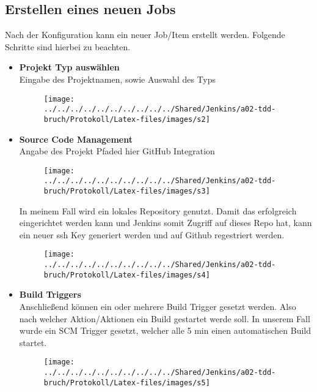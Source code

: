 \subsection{Erstellen eines neuen Jobs}
Nach der Konfiguration kann ein neuer Job/Item erstellt werden.
Folgende Schritte sind hierbei zu beachten.
\begin{itemize}
	\item \textbf{Projekt Typ auswählen}\\
	Eingabe des Projektnamen, sowie Auswahl des Typs
	\begin{figure}[!h]
		\centering
		\texttt{[image: ../../../../../../../../../../Shared/Jenkins/a02-tdd-bruch/Protokoll/Latex-files/images/s2]}
		\label{fig:s2}
	\end{figure}
	
	\item \textbf{Source Code Management}\\
	Angabe des Projekt Pfaded hier GitHub Integration
	\begin{figure}[!h]
		\centering
		\texttt{[image: ../../../../../../../../../../Shared/Jenkins/a02-tdd-bruch/Protokoll/Latex-files/images/s3]}
		\label{fig:s3}
	\end{figure}
	In meinem Fall wird ein lokales Repository genutzt. Damit das erfolgreich eingerichtet werden kann und Jenkins somit Zugriff auf dieses Repo hat, kann ein neuer ssh Key generiert werden und auf Github regestriert werden.
	\begin{figure}[!h]
		\centering
		\texttt{[image: ../../../../../../../../../../Shared/Jenkins/a02-tdd-bruch/Protokoll/Latex-files/images/s4]}
		\label{fig:s4}
	\end{figure}
	
	\clearpage
	
	\item \textbf{Build Triggers}\\
	Anschließend können ein oder mehrere Build Trigger gesetzt werden. Also nach welcher Aktion/Aktionen ein Build gestartet werde soll. In unserem Fall wurde ein SCM Trigger gesetzt, welcher alle 5 min einen automatischen Build startet.
	\begin{figure}[!h]
		\centering
		\texttt{[image: ../../../../../../../../../../Shared/Jenkins/a02-tdd-bruch/Protokoll/Latex-files/images/s5]}
		\label{fig:s5}
	\end{figure}
	

\end{itemize}
